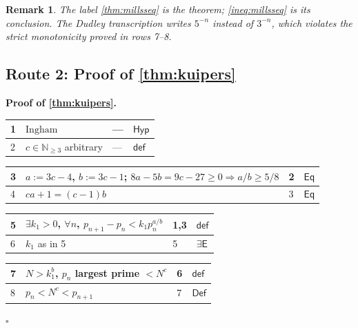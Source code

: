 \documentclass[11pt,reqno]{amsart}
\theoremstyle{blueplain}
\newtheorem{remark}{Remark}[section]
\renewcommand{\qedsymbol}{\textcolor{proofqed}{\ensuremath{\square}}}
\renewenvironment{proof}[1][Proof]{\par\noindent\textbf{\textcolor{proofhead}{#1.}}\par\nobreak}{\par\nobreak\hfill\qedsymbol}
\numberwithin{equation}{section}
\begin{document}
\begin{remark}
	{\scriptsize The label \cref{thm:millsseq} is the theorem; \cref{ineq:millsseq} is its conclusion.  The Dudley transcription writes $5^{-n}$ instead of $3^{-n}$, which violates the strict monotonicity proved in rows 7--8. }
\end{remark}

\subsection{Route 2: Proof of \cref{thm:kuipers}}

\begin{proof}[\textbf{Proof of \cref{thm:kuipers}}]
	\label{proof:kuipers}
	{\scriptsize
		\begin{tabular}{|m{0.7cm}|m{12cm}|m{1.4cm}|m{2.5cm}|}
			\hline
			1 & $\text{Ingham}$ & --- & $\mathsf{Hyp}$ \\ \hline
			2 & $c\in\mathbb{N}_{\geq 3}$ arbitrary & --- & $\mathsf{def}$ \\
		\end{tabular}%
		\noindent \newline
		\noindent
		\begin{tabular}{|m{0.7cm}|m{12cm}|m{1.4cm}|m{2.5cm}|}
			\hline
			3 & $a:=3c-4$, $b:=3c-1$; $8a-5b=9c-27\ge 0\Rightarrow a/b\ge 5/8$ & 2 & $\mathsf{Eq}$ \\ \hline
			4 & $ca+1=(c-1)b$ & 3 & $\mathsf{Eq}$ \\
		\end{tabular}%
		\noindent \newline
		\noindent
		\begin{tabular}{|m{0.7cm}|m{12cm}|m{1.4cm}|m{2.5cm}|}
			\hline
			5 & $\exists k_1>0$, $\forall n$, $p_{n+1}-p_n<k_1 p_n^{a/b}$ & 1,3 & $\mathsf{def}$ \\ \hline
			6 & $k_1$ as in 5 & 5 & $\exists\mathsf{E}$ \\
		\end{tabular}%
		\noindent \newline
		\noindent
		\begin{tabular}{|m{0.7cm}|m{12cm}|m{1.4cm}|m{2.5cm}|}
			\hline
			7 & $N>k_1^{b}$, $p_n$ largest prime $<N^{c}$ & 6 & $\mathsf{def}$ \\ \hline
			8 & $p_n<N^{c}<p_{n+1}$ & 7 & $\mathsf{Def}$ \\

\end{tabular}}
\end{proof}
\end{document}

